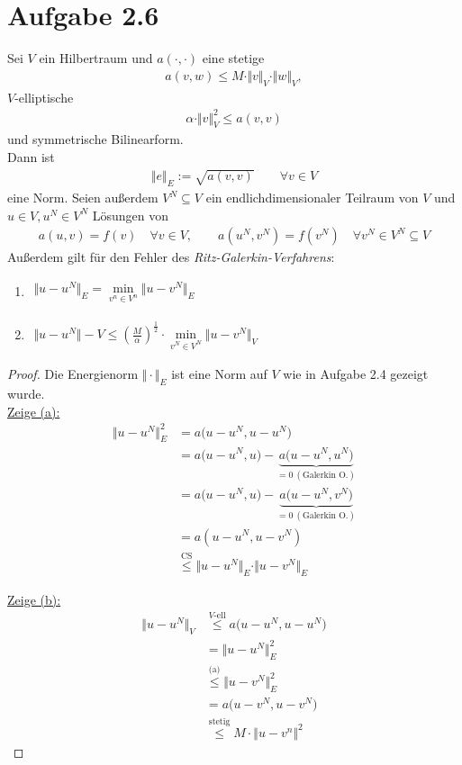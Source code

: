 \documentclass[12pt,a4paper]{article}
\begin{document}
\section*{Aufgabe 2.6}
Sei $V$ ein Hilbertraum und  $a(\cdot,\cdot)$ eine stetige
\begin{align*}
a(v,w)\leq M\cdot\Vert v\Vert_V\cdot\Vert w\Vert_V,
\end{align*}
$V$-elliptische
\begin{align*}
\alpha\cdot\Vert v\Vert^2_V\leq a(v,v)
\end{align*}
und symmetrische Bilinearform.\\
Dann ist
\begin{align*}
\Vert e\Vert_E:=\sqrt{a(v,v)}\qquad\forall v\in V
\end{align*}
eine Norm. Seien außerdem $V^N\subseteq V$ ein endlichdimensionaler Teilraum von $V$ und $u\in V,u^N\in V^N$ Lösungen von
\begin{align*}
a(u,v)=f(v)\quad\forall v\in V,\qquad a(u^N,v^N)=f(v^N)\quad\forall v^N\in V^N\subseteq V
\end{align*}
Außerdem gilt für den Fehler des \textit{Ritz-Galerkin-Verfahrens}:
\begin{enumerate}[label=(\alph*)]
\item $\begin{aligned}
\Vert u-u^N\Vert_E=\min\limits_{v^n\in V^n}\Vert u-v^N\Vert_E
\end{aligned}$
\item $\begin{aligned}
\Vert u-u^N\Vert-V\leq\left(\frac{M}{\alpha}\right)^{\frac{1}{2}}\cdot\min\limits_{v^N\in V^N}\Vert u-v^N\Vert_V
\end{aligned}$
\end{enumerate}
\begin{proof}
Die Energienorm $\Vert\cdot\Vert_E$ ist eine Norm auf $V$ wie in Aufgabe 2.4 gezeigt wurde.\\

\underline{Zeige (a):}
\begin{align*}
\Vert u-u^N\Vert_E^2
&=a\big(u-u^N,u-u^N\big) \\
&=a\big(u-u^N,u\big) - \underbrace{a\big(u-u^N,u^N\big)}_{=0~(\text{Galerkin O.})} \\
&=a\big(u-u^N,u\big) - \underbrace{a\big(u-u^N,v^N\big)}_{=0~(\text{Galerkin O.})} \\
&=a(u-u^N,u-v^N)\\
&\stackrel{\text{CS}}{\leq}
\Vert u-u^N\Vert_E\cdot\Vert u-v^N\Vert_E
\end{align*}

\underline{Zeige (b):}
\begin{align*}
\Vert u-u^N\Vert_V
&\stackrel{V\text{-ell}}{\leq}
a\big(u-u^N,u-u^N\big)\\
&=\big\Vert u-u^N\big\Vert^2_E\\
&\stackrel{\text{(a)}}{\leq}
\big\Vert u-v^N\big\Vert^2_E\\
&=a\big(u-v^N,u-v^N\big)\\
&\stackrel{\text{stetig}}{\leq}
M\cdot\big\Vert u-v^n\big\Vert^2
\end{align*}
\end{proof}
\end{document}
